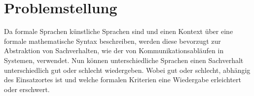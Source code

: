 \section{Problemstellung}
\label{sc:Problemstellung}
Da formale Sprachen künstliche Sprachen sind und einen Kontext über eine formale mathematische Syntax beschreiben, werden diese bevorzugt zur Abstraktion von Sachverhalten, wie der von Kommunikationsabläufen in Systemen, verwendet. Nun können unterschiedliche Sprachen einen Sachverhalt unterschiedlich gut oder schlecht wiedergeben. Wobei gut oder schlecht, abhängig des Einsatzortes ist und welche formalen Kriterien eine Wiedergabe erleichtert oder erschwert.
